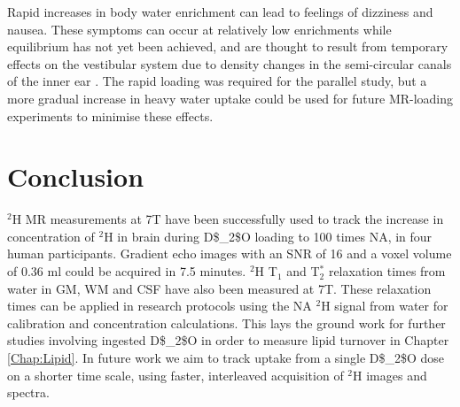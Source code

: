 Rapid increases in body water enrichment can lead to feelings of dizziness and nausea. These symptoms can occur at relatively low enrichments while equilibrium has not yet been achieved, and are thought to result from temporary effects on the vestibular system due to density changes in the semi-circular canals of the inner ear \cite{Money1974HeavyAlcohol}. The rapid loading was required for the parallel study, but a more gradual increase in heavy water uptake could be used for future MR-loading experiments to minimise these effects. 

\section{Conclusion}

$^2$H MR measurements at 7T have been successfully used to track the increase in concentration of $^2$H in brain during \ac{D$_2$O} loading to 100 times \ac{NA}, in four human participants. Gradient echo images with an \ac{SNR} of 16 and a voxel volume of 0.36 ml could be acquired in 7.5 minutes. $^2$H T$_1$ and T$_2^*$ relaxation times from water in \ac{GM}, \ac{WM} and \ac{CSF} have also been measured at 7T. These relaxation times can be applied in research protocols using the \ac{NA} $^2$H signal from water for calibration and concentration calculations. This lays the ground work for further studies involving ingested \ac{D$_2$O} in order to measure lipid turnover in Chapter \ref{Chap:Lipid}. In future work we aim to track uptake from a single \ac{D$_2$O} dose on a shorter time scale, using faster, interleaved acquisition of $^2$H images and spectra. 

